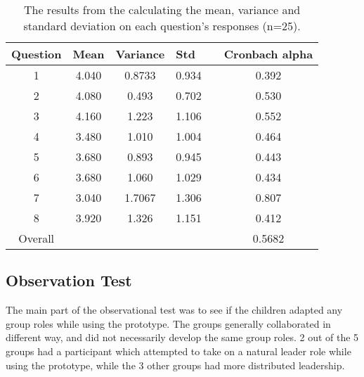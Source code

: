 \begin{table}[H]
\centering
\caption{The results from the calculating the mean, variance and standard deviation on each question's responses (n=25).}
\label{table:questionsCalc}
\begin{tabular}{@{}cccclc@{}}
\toprule
\multicolumn{1}{l}{Question} & \multicolumn{1}{l}{Mean} & \multicolumn{1}{l}{Variance} & \multicolumn{1}{l}{Std} &  & \multicolumn{1}{l}{Cronbach alpha} \\ \midrule
1                            & 4.040                    & 0.8733                       & 0.934                   &  & 0.392                              \\
2                            & 4.080                    & 0.493                        & 0.702                   &  & 0.530                              \\
3                            & 4.160                    & 1.223                        & 1.106                   &  & 0.552                              \\
4                            & 3.480                    & 1.010                        & 1.004                   &  & 0.464                              \\
5                            & 3.680                    & 0.893                        & 0.945                   &  & 0.443                              \\
6                            & 3.680                    & 1.060                        & 1.029                   &  & 0.434                              \\
7                            & 3.040                    & 1.7067                       & 1.306                   &  & 0.807                              \\
8                            & 3.920                    & 1.326                        & 1.151                   &  & 0.412                              \\ \midrule
Overall                        & \multicolumn{1}{l}{}     & \multicolumn{1}{l}{}         & \multicolumn{1}{l}{}    &  & 0.5682                             \\ \bottomrule
\end{tabular}
\end{table}

\subsection{Observation Test}
The main part of the observational test was to see if the children adapted any group roles while using the prototype. The groups generally collaborated in different way, and did not necessarily develop the same group roles. 2 out of the 5 groups 
had a participant which attempted to take on a natural leader role while using the prototype, while the 3 other groups had more distributed leadership. 